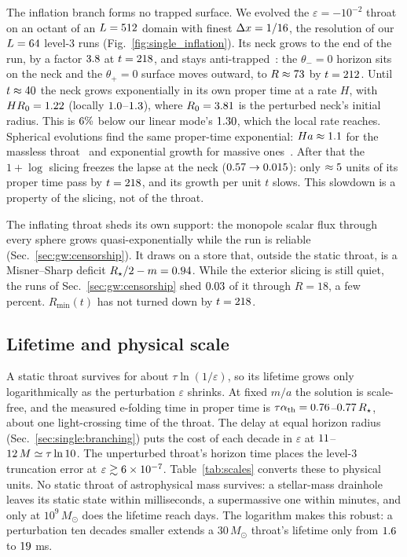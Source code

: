 \documentclass[twocolumn,floatfix,aps,prd,superscriptaddress,nofootinbib,showkeys]{revtex4-2}
\begin{document}
The inflation branch forms no trapped surface. We evolved the $\varepsilon=-10^{-2}$ throat on an octant of an $L=512$ domain with finest $\Delta x=1/16$, the resolution of our $L=64$ level-3 runs (Fig.~\ref{fig:single_inflation}). Its neck grows to the end of the run, by a factor $3.8$ at $t=218$, and stays anti-trapped~\cite{hayward1999}: the $\theta_-=0$ horizon sits on the neck and the $\theta_+=0$ surface moves outward, to $R\approx73$ by $t=212$. Until $t\approx40$ the neck grows exponentially in its own proper time at a rate $H$, with $HR_0=1.22$ (locally $1.0$--$1.3$), where $R_0=3.81$ is the perturbed neck's initial radius. This is $6\%$ below our linear mode's $1.30$, which the local rate reaches. Spherical evolutions find the same proper-time exponential: $Ha\approx1.1$ for the massless throat~\cite{shinkai2002} and exponential growth for massive ones~\cite{gonzalez2009}. After that the $1{+}\log$ slicing freezes the lapse at the neck ($0.57\to0.015$): only $\approx5$ units of its proper time pass by $t=218$, and its growth per unit $t$ slows. This slowdown is a property of the slicing, not of the throat.

The inflating throat sheds its own support: the monopole scalar flux through every sphere grows quasi-exponentially while the run is reliable (Sec.~\ref{sec:gw:censorship}). It draws on a store that, outside the static throat, is a Misner--Sharp deficit $R_\star/2-m=0.94$. While the exterior slicing is still quiet, the runs of Sec.~\ref{sec:gw:censorship} shed $0.03$ of it through $R=18$, a few percent. $R_{\min}(t)$ has not turned down by $t=218$.

\subsection{Lifetime and physical scale}
\label{sec:single:lifetime}

A static throat survives for about $\tau\ln(1/\varepsilon)$, so its lifetime grows only logarithmically as the perturbation $\varepsilon$ shrinks. At fixed $m/a$ the solution is scale-free, and the measured e-folding time in proper time is $\tau\alpha_{\rm th}=0.76$--$0.77\,R_\star$, about one light-crossing time of the throat. The delay at equal horizon radius (Sec.~\ref{sec:single:branching}) puts the cost of each decade in $\varepsilon$ at $11$--$12\,M\simeq\tau\ln10$. The unperturbed throat's horizon time places the level-3 truncation error at $\varepsilon\gtrsim6\times10^{-7}$. Table~\ref{tab:scales} converts these to physical units. No static throat of astrophysical mass survives: a stellar-mass drainhole leaves its static state within milliseconds, a supermassive one within minutes, and only at $10^9\,M_\odot$ does the lifetime reach days. The logarithm makes this robust: a perturbation ten decades smaller extends a $30\,M_\odot$ throat's lifetime only from $1.6$ to $19$ ms.
\end{document}
